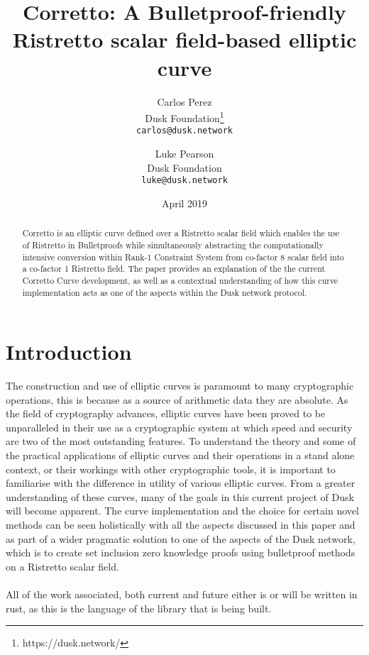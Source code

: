 \documentclass{article}
\title{Corretto: A Bulletproof-friendly Ristretto scalar field-based elliptic curve}
\author{
  Carlos Perez\\
  Dusk Foundation\footnote{https://dusk.network/}\\
  \texttt{carlos@dusk.network}
  \and
  Luke Pearson\\
  Dusk Foundation\\
  \texttt{luke@dusk.network}
}
\date{April 2019}
\begin{document}
\maketitle
\thispagestyle{empty}
\pagestyle{empty}

\begin{abstract}
Corretto is an elliptic curve defined over a Ristretto scalar field which enables the use of Ristretto in Bulletproofs while simultaneously abstracting the computationally intensive conversion within Rank-1 Constraint System from co-factor 8 scalar field into a co-factor 1 Ristretto field. The paper provides an explanation of the the current Corretto Curve development, as well as a contextual understanding of how this curve implementation acts as one of the aspects within the Dusk network protocol.


\end{abstract}

\newpage

\tableofcontents

\newpage

\section{Introduction}
The construction and use of elliptic curves is paramount to many cryptographic operations, this is because as a source of arithmetic data they are absolute.  As the field of cryptography advances, elliptic curves have been proved to be unparalleled in their use as a cryptographic system at which speed and security are two of the most outstanding features.  To understand the theory and some of the practical applications of elliptic curves and their operations in a stand alone context, or their workings with other cryptographic tools, it is important to familiarise with the difference in utility of various elliptic curves. From a greater understanding of these curves, many of the goals in this current project of Dusk will become apparent.  The curve implementation and the choice for certain novel methods can be seen holistically with all the aspects discussed in this paper and as part of a wider pragmatic solution to one of the aspects of the Dusk network, which is to create set inclusion zero knowledge proofs using bulletproof methods on a Ristretto scalar field. \\\\
All of the work associated, both current and future either is or will be written in rust, as this is the language of the library that is being built.
\end{document}

